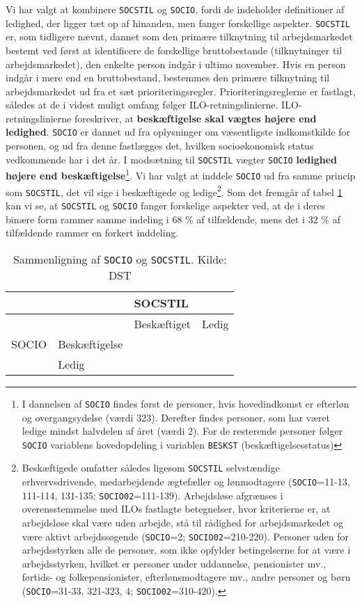 Vi har valgt at kombinere \texttt{SOCSTIL} og \texttt{SOCIO}, fordi de indeholder definitioner af ledighed, der ligger tæt op af hinanden, men fanger forskellige aspekter. \texttt{SOCSTIL} er, som tidligere nævnt, dannet som den primære tilknytning til arbejdsmarkedet bestemt ved først at identificere de forskellige bruttobestande (tilknytninger til arbejdsmarkedet), den enkelte person indgår i ultimo november. Hvis en person indgår i mere end en bruttobestand, bestemmes den primære tilknytning til arbejdsmarkedet ud fra et sæt prioriteringsregler. Prioriteringsreglerne er fastlagt, således at de i videst muligt omfang følger ILO-retningslinierne. ILO-retningslinierne foreskriver, at \textbf{beskæftigelse skal vægtes højere end ledighed}. \texttt{SOCIO} er dannet ud fra oplysninger om væsentligste indkomstkilde for personen, og ud fra denne fastlægges det, hvilken socioøkonomisk status vedkommende har i det år. I modsætning til \texttt{SOCSTIL} vægter \texttt{SOCIO} \textbf{ledighed højere end beskæftigelse}\footnote{I dannelsen af \texttt{SOCIO} findes først de personer, hvis hovedindkomst er efterløn og overgangsydelse (værdi 323). Derefter findes personer, som har været ledige mindst halvdelen af året (værdi 2). For de resterende personer følger \texttt{SOCIO} variablens hovedopdeling i variablen \texttt{BESKST} (beskæftigelsesstatus)}. Vi har valgt at inddele \texttt{SOCIO} ud fra samme princip som \texttt{SOCSTIL}, det vil sige i beskæftigede og ledige\footnote{Beskæftigede omfatter således ligesom \texttt{SOCSTIL} selvstændige erhvervsdrivende, medarbejdende ægtefæller og lønmodtagere (\texttt{SOCIO}=11-13, 111-114, 131-135; \texttt{SOCIO02}=111-139). Arbejdsløse afgrænses i overensstemmelse med ILOs fastlagte betegnelser, hvor kriterierne er, at arbejdsløse skal  være uden arbejde, stå til rådighed for arbejdsmarkedet og være aktivt arbejdssøgende (\texttt{SOCIO}=2; \texttt{SOCIO02}=210-220). Personer uden for arbejdsstyrken alle de personer, som ikke opfylder betingelserne for at være i arbejdsstyrken, hvilket er personer under uddannelse, pensionister mv., førtids- og folkepensionister, efterlønsmodtagere mv., andre personer og børn (\texttt{SOCIO}=31-33, 321-323, 4; \texttt{SOCIO02}=310-420).}. Som det fremgår af tabel \ref{tab_SOCIO_SOCSTIL_sammenligning} kan vi se, at \texttt{SOCSTIL} og \texttt{SOCIO} fanger forskelige aspekter ved, at de i deres binære form rammer samme indeling i 68 \% af tilfældende, mens det i 32 \% af tilfældende rammer en forkert inddeling.
% 
\begin{table}[H] \centering
\caption{Sammenligning af \texttt{SOCIO} og \texttt{SOCSTIL}. Kilde: DST}
\label{tab_SOCIO_SOCSTIL_sammenligning}
\begin{tabular}{@{}llll@{}} \toprule
 & & SOCSTIL &  \\ \midrule
 & & Beskæftiget & Ledig \\ 
 SOCIO & Beskæftigelse & & \\ 
 & Ledig & & \\  \bottomrule
\end{tabular} \end{table}
